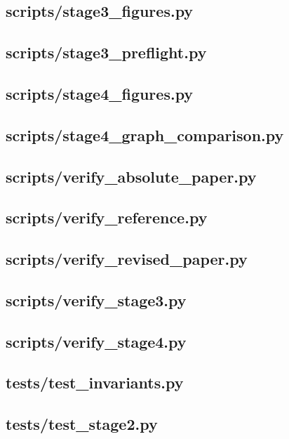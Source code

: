 \documentclass{mathorcup-journal}
\begin{document}
\subsection*{scripts/stage3\_figures.py}

\subsection*{scripts/stage3\_preflight.py}

\subsection*{scripts/stage4\_figures.py}

\subsection*{scripts/stage4\_graph\_comparison.py}

\subsection*{scripts/verify\_absolute\_paper.py}

\subsection*{scripts/verify\_reference.py}

\subsection*{scripts/verify\_revised\_paper.py}

\subsection*{scripts/verify\_stage3.py}

\subsection*{scripts/verify\_stage4.py}

\subsection*{tests/test\_invariants.py}

\subsection*{tests/test\_stage2.py}

\end{document}
